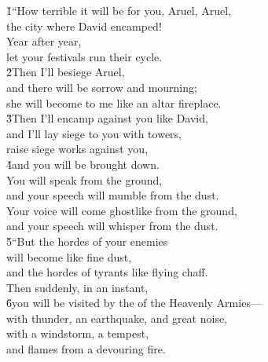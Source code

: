 \begin{poetry}
\poeml {}
\v{1}``How terrible it will be for you, Aruel, Aruel, \\
\poemll    the city where David encamped! \\
\poeml Year after year, \\
\poemll    let your festivals run their cycle. \\
\poeml \v{2}Then I'll besiege Aruel, \\
\poemll    and there will be sorrow and mourning; \\
\poemlll       she will become to me like an altar fireplace. \\
\poeml \v{3}Then I'll encamp against you like David, \\
\poemll    and I'll lay siege to you with towers, \\
\poeml raise siege works against you, \\
\poeml \v{4}and you will be brought down. \\
\poeml You will speak from the ground, \\
\poemll    and your speech will mumble from the dust. \\
\poeml Your voice will come ghostlike from the ground, \\
\poemll    and your speech will whisper from the dust. \\
\poeml \v{5}``But the hordes of your enemies \\
\poemll    will become like fine dust, \\
\poemlll       and the hordes of tyrants like flying chaff. \\
\poeml Then suddenly, in an instant, \\
\poeml \v{6}you will be visited by the  of the Heavenly Armies--- \\
\poeml with thunder, an earthquake, and great noise, \\
\poemll    with a windstorm, a tempest, \\
\poemlll       and flames from a devouring fire. \\

\end{poetry}
